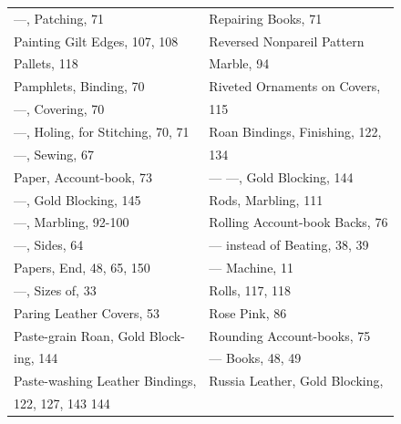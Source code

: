 \documentclass[twoside]{book}
\begin{document}
\begin{center}
\begin{tiny}
\begin{tabular}{l|l}
---, Patching, 71                   & Repairing Books, 71               \\
Painting Gilt Edges, 107, 108       & Reversed Nonpareil Pattern        \\
Pallets, 118                        &     Marble, 94                    \\
Pamphlets, Binding, 70              & Riveted Ornaments on Covers,      \\
---, Covering, 70                   &     115                           \\
---, Holing, for Stitching, 70, 71  & Roan Bindings, Finishing, 122,    \\
---, Sewing, 67                     &     134                           \\
Paper, Account-book, 73             & --- ---, Gold Blocking, 144       \\
---, Gold Blocking, 145             & Rods, Marbling, 111               \\
---, Marbling, 92-100               & Rolling Account-book Backs, 76    \\
---, Sides, 64                      & --- instead of Beating, 38, 39    \\
Papers, End, 48, 65, 150            & --- Machine, 11                   \\
---, Sizes of, 33                   & Rolls, 117, 118                   \\
Paring Leather Covers, 53           & Rose Pink, 86                     \\
Paste-grain Roan, Gold Block-       & Rounding Account-books, 75        \\
    ing, 144                        & --- Books, 48, 49                 \\
Paste-washing Leather Bindings,     & Russia Leather, Gold Blocking,    \\
    122, 127, 143                         144                           \\

\end{tabular}

\pagebreak

\begin{tabular}{l|l}


\end{tabular}
\end{tiny}
\end{center}
\end{document}
